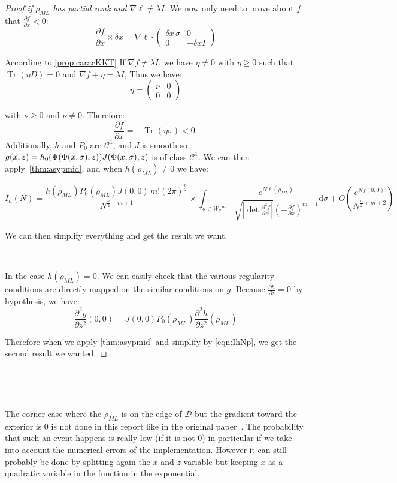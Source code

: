\documentclass[10pt,a4paper]{report}
\theoremstyle{plain}
\theoremstyle{definition}
\theoremstyle{remark}
\newcommand{\dd}{\mathrm{d}}
\newcommand{\dpar}[2]{\frac{\partial{#1}}{\partial{#2}}}
\newcommand{\dparn}[3]{\frac{\partial^{#3} {#1}}{\partial{#2}^{#3}}}
\renewcommand{\geq}{\geqslant}
\newcommand{\mat}[1]{\begin{pmatrix}#1\end{pmatrix}}
\DeclareMathOperator{\Tr}{Tr}
\newcommand{\class}[1]{{\mathscr{C}^{#1}}}
\newcommand{\ml}{_{M\!L}}
\begin{document}
\begin{proof}[Proof if $\rho\ml$ has partial rank and $\nabla \ell \neq \lambda I$]
  We now only need to prove about $f$ that $\dpar f x < 0$:
  \[\dpar f x \times \delta x = \nabla \ell \cdot \mat{\delta x\, \sigma & 0\\0 &-
      \delta x I} \]

  According to \cref{prop:caracKKT} If $\nabla f \neq \lambda I$, we have $\eta
  \neq 0$ with $\eta \geq 0$ such that $\Tr(\eta D) = 0$ and $\nabla f + \eta =
  \lambda I$, Thus we have:
  \begin{equation}\label{eqn:etanu}
  \eta = \mat{\nu&0\\0&0}
  \end{equation}

  with $\nu \geq 0$ and $\nu \neq 0$. Therefore:
  \[\dpar f x = - \Tr(\eta\sigma) <0.\]
  Additionally, $h$ and $P_0$ are $\class 1$, and $J$ is smooth so $g(x,z) =
  h_0(\Psi(\Phi(x,\sigma),z))J(\Phi(x,\sigma),z)$ is of class $\class 1$. We can then
  apply~\cref{thm:asypmid}, and when $h(\rho\ml) \neq 0$ we have:

  \begin{equation}\label{eqn:IhNp}
    I_h(N) =
    \frac{h(\rho\ml)P_0(\rho\ml)J(0,0)\,m! {(2\pi)}^{\frac n 2}}{N^{\frac n 2 + m + 1}} \times
    \int_{\sigma \in W_\sigma''''}\frac{e^{N\ell(\rho\ml)}}
    {\sqrt{\left|\det \dparn f z 2\right|} \left(-\dpar f x\right)^{m+1}} \dd \sigma
    + O\left(\frac{e^{Nf(0,0)}}{N^{\frac n 2 + m + 2}}\right)
  \end{equation}

  We can then simplify everything and get the result we want.

  \

  In the case $h(\rho\ml) = 0$. We can easily check that the various regularity conditions
  are directly mapped on the similar conditions on $g$. Because $\dpar h z = 0$
  by hypothesis, we have:
  \[\dparn g z 2(0,0) = J(0,0)P_0(\rho\ml) \dparn h z 2 (\rho\ml)\]

  Therefore when we apply \cref{thm:asypmid} and simplify by \cref{eqn:IhNp},
  we get the second result we wanted.
\end{proof}


\

\

The corner case where the $\rho\ml$ is on the edge of $\mathcal{D}$ but the
gradient toward the exterior is 0 is not done in this report like in the original
paper~\cite{SPRAL17}. The probability that such an event happens is really low
(if it is not 0) in particular if we take into account the numerical errors of
the implementation. However it can still probably be done by splitting again the
$x$ and $z$ variable but keeping $x$ as a quadratic variable in the function in
the exponential.
\end{document}
